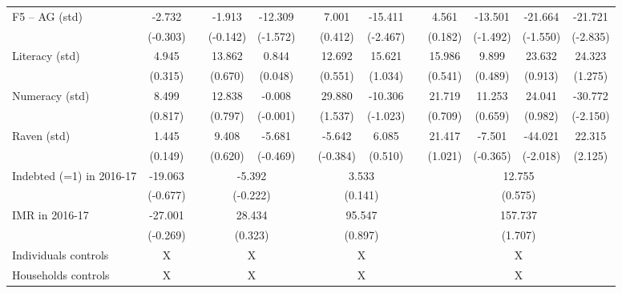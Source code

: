 \begin{table}[htbp]
{\begin{tabular}{lcccccccccccc}
    F5  -- AG (std) & -2.732 &       & -1.913 & -12.309 &       & 7.001 & \cellcolor[rgb]{ 1,  1,  0}-15.411 &       & 4.561 & -13.501 & -21.664 & \cellcolor[rgb]{ 1,  1,  0}-21.721 \\
          & (-0.303) &       & (-0.142) & (-1.572) &       & (0.412) & (-2.467) &       & (0.182) & (-1.492) & (-1.550) & (-2.835) \\
    Literacy (std) & 4.945 &       & 13.862 & 0.844 &       & 12.692 & 15.621 &       & 15.986 & 9.899 & 23.632 & 24.323 \\
          & (0.315) &       & (0.670) & (0.048) &       & (0.551) & (1.034) &       & (0.541) & (0.489) & (0.913) & (1.275) \\
    Numeracy (std) & 8.499 &       & 12.838 & -0.008 &       & 29.880 & -10.306 &       & 21.719 & 11.253 & 24.041 & \cellcolor[rgb]{ 1,  1,  0}-30.772 \\
          & (0.817) &       & (0.797) & (-0.001) &       & (1.537) & (-1.023) &       & (0.709) & (0.659) & (0.982) & (-2.150) \\
    Raven (std) & 1.445 &       & 9.408 & -5.681 &       & -5.642 & 6.085 &       & 21.417 & -7.501 & \cellcolor[rgb]{ 1,  1,  0}-44.021 & \cellcolor[rgb]{ 1,  1,  0}22.315 \\
          & (0.149) &       & (0.620) & (-0.469) &       & (-0.384) & (0.510) &       & (1.021) & (-0.365) & (-2.018) & (2.125) \\
\cmidrule{1-2}\cmidrule{4-5}\cmidrule{7-8}\cmidrule{10-13}    Indebted (=1) in 2016-17 & -19.063 &       & \multicolumn{2}{c}{-5.392} &       & \multicolumn{2}{c}{3.533} &       & \multicolumn{4}{c}{12.755} \\
          & (-0.677) &       & \multicolumn{2}{c}{(-0.222)} &       & \multicolumn{2}{c}{(0.141)} &       & \multicolumn{4}{c}{(0.575)} \\
    IMR in 2016-17 & -27.001 &       & \multicolumn{2}{c}{28.434} &       & \multicolumn{2}{c}{95.547} &       & \multicolumn{4}{c}{157.737} \\
          & (-0.269) &       & \multicolumn{2}{c}{(0.323)} &       & \multicolumn{2}{c}{(0.897)} &       & \multicolumn{4}{c}{(1.707)} \\
    Individuals controls & X     &       & \multicolumn{2}{c}{X} &       & \multicolumn{2}{c}{X} &       & \multicolumn{4}{c}{X} \\
    Households controls & X     &       & \multicolumn{2}{c}{X} &       & \multicolumn{2}{c}{X} &       & \multicolumn{4}{c}{X} \\

\end{tabular}}
\end{table}
